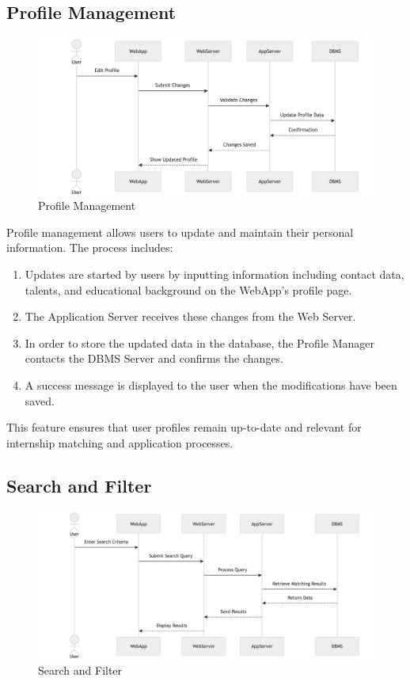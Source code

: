 \subsection{Profile Management}
\label{subsec:profile_management}
\begin{figure}[H]
    \begin{center}
        \includegraphics[width=0.82\linewidth]{JhaBhatiaSharma/imagesDD/ProfileManagement.png}
        \caption{Profile Management}
        \label{fig:profilemanagement}%
    \end{center}
\end{figure}

Profile management allows users to update and maintain their personal information. The process includes:
\begin{enumerate}
    \item Updates are started by users by inputting information including contact data, talents, and educational background on the WebApp's profile page.
    \item The Application Server receives these changes from the Web Server.
    \item In order to store the updated data in the database, the Profile Manager contacts the DBMS Server and confirms the changes.
    \item A success message is displayed to the user when the modifications have been saved.
\end{enumerate}
This feature ensures that user profiles remain up-to-date and relevant for internship matching and application processes.

\subsection{Search and Filter}
\label{subsec:search_and_filter}

\begin{figure}[H]
    \begin{center}
        \includegraphics[width=0.82\linewidth]{JhaBhatiaSharma/imagesDD/SearchandFilter.png}
        \caption{Search and Filter}
        \label{fig:searchandfileter}%
    \end{center}
\end{figure}

